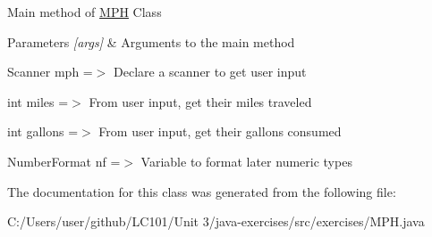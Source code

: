 Main method of \mbox{\hyperlink{classexercises_1_1_m_p_h}{M\+PH}} Class 
\begin{DoxyParams}{Parameters}
{\em \mbox{[}args\mbox{]}} & Arguments to the main method \\
\hline
\end{DoxyParams}
Scanner mph =$>$ Declare a scanner to get user input

int miles =$>$ From user input, get their miles traveled

int gallons =$>$ From user input, get their gallons consumed

Number\+Format nf =$>$ Variable to format later numeric types 

The documentation for this class was generated from the following file\+:\begin{DoxyCompactItemize}
\item 
C\+:/\+Users/user/github/\+L\+C101/\+Unit 3/java-\/exercises/src/exercises/M\+P\+H.\+java\end{DoxyCompactItemize}
